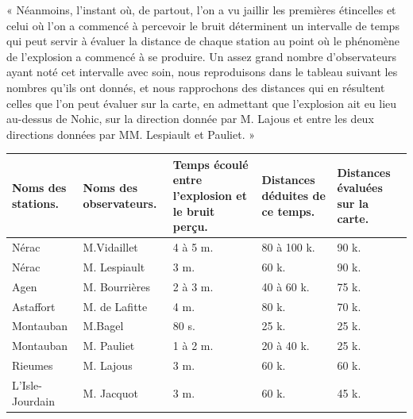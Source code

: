 \documentclass[a4paper, 11pt, oneside, polutonikogreek, french]{article}
\begin{document}
« Néanmoins, l'instant où, de partout, l'on a vu jaillir les premières étincelles et celui où l'on a commencé à percevoir le bruit déterminent un intervalle de temps qui peut servir à évaluer la distance de chaque station au point où le phénomène de l'explosion a commencé à se produire. Un assez grand nombre d'observateurs ayant noté cet intervalle avec soin, nous reproduisons dans le tableau suivant les nombres qu'ils ont donnés, et nous rapprochons des distances qui en résultent celles que l'on peut évaluer sur la carte, en admettant que l'explosion ait eu lieu au-dessus de Nohic, sur la direction donnée par M. Lajous et entre les deux directions données par MM. Lespiault et Pauliet. »
\begin{table}[H]
    \centering
    \begin{tabular}{|p{18mm}|p{23mm}|p{22mm}|p{16mm}|p{15mm}|}
    \hline
        Noms des stations. & Noms des observateurs. & Temps écoulé entre l'explosion et le bruit perçu. & Distances déduites de ce temps. & Distances évaluées sur la carte. \\ \hline
        Nérac & M.Vidaillet & 4 à 5 m. & 80 à 100 k. & 90 k. \\ \hline
        Nérac & M. Lespiault & 3 m. & 60 k. & 90 k. \\ \hline
        Agen & M. Bourrières & 2 à 3 m. & 40 à 60 k. & 75 k. \\ \hline
        Astaffort & M. de Lafitte & 4 m. & 80 k. & 70 k. \\ \hline
        Montauban & M.Bagel & 80 s. & 25 k. & 25 k. \\ \hline
        Montauban & M. Pauliet & 1 à 2 m. & 20 à 40 k. & 25 k. \\ \hline
        Rieumes & M. Lajous & 3 m. & 60 k. & 60 k. \\ \hline
        L'Isle-Jourdain & M. Jacquot & 3 m. & 60 k. & 45 k. \\ \hline
    \end{tabular}
\end{table}
\end{document}
